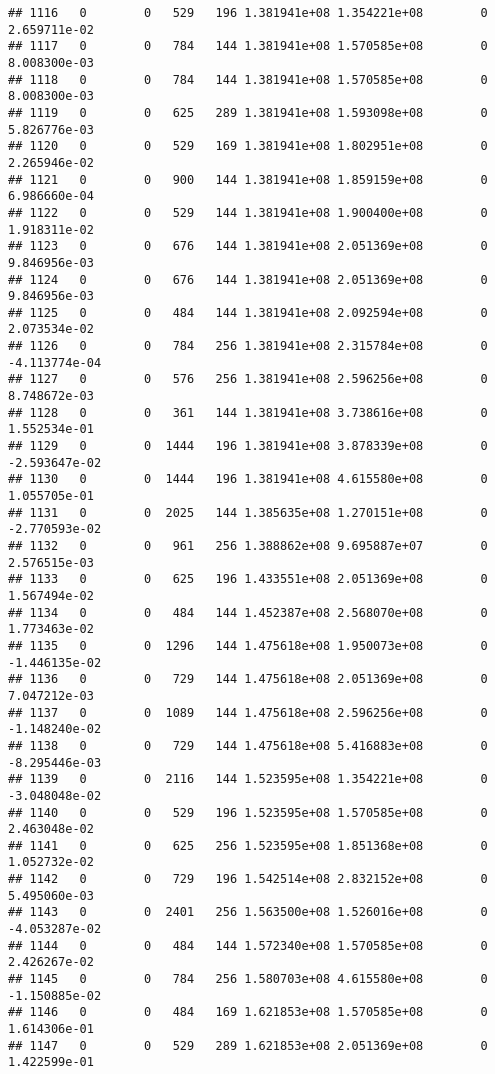 \documentclass[
]{article}
\begin{document}
\begin{enumerate}
\begin{verbatim}
## 1116   0        0   529   196 1.381941e+08 1.354221e+08        0  2.659711e-02
## 1117   0        0   784   144 1.381941e+08 1.570585e+08        0  8.008300e-03
## 1118   0        0   784   144 1.381941e+08 1.570585e+08        0  8.008300e-03
## 1119   0        0   625   289 1.381941e+08 1.593098e+08        0  5.826776e-03
## 1120   0        0   529   169 1.381941e+08 1.802951e+08        0  2.265946e-02
## 1121   0        0   900   144 1.381941e+08 1.859159e+08        0  6.986660e-04
## 1122   0        0   529   144 1.381941e+08 1.900400e+08        0  1.918311e-02
## 1123   0        0   676   144 1.381941e+08 2.051369e+08        0  9.846956e-03
## 1124   0        0   676   144 1.381941e+08 2.051369e+08        0  9.846956e-03
## 1125   0        0   484   144 1.381941e+08 2.092594e+08        0  2.073534e-02
## 1126   0        0   784   256 1.381941e+08 2.315784e+08        0 -4.113774e-04
## 1127   0        0   576   256 1.381941e+08 2.596256e+08        0  8.748672e-03
## 1128   0        0   361   144 1.381941e+08 3.738616e+08        0  1.552534e-01
## 1129   0        0  1444   196 1.381941e+08 3.878339e+08        0 -2.593647e-02
## 1130   0        0  1444   196 1.381941e+08 4.615580e+08        0  1.055705e-01
## 1131   0        0  2025   144 1.385635e+08 1.270151e+08        0 -2.770593e-02
## 1132   0        0   961   256 1.388862e+08 9.695887e+07        0  2.576515e-03
## 1133   0        0   625   196 1.433551e+08 2.051369e+08        0  1.567494e-02
## 1134   0        0   484   144 1.452387e+08 2.568070e+08        0  1.773463e-02
## 1135   0        0  1296   144 1.475618e+08 1.950073e+08        0 -1.446135e-02
## 1136   0        0   729   144 1.475618e+08 2.051369e+08        0  7.047212e-03
## 1137   0        0  1089   144 1.475618e+08 2.596256e+08        0 -1.148240e-02
## 1138   0        0   729   144 1.475618e+08 5.416883e+08        0 -8.295446e-03
## 1139   0        0  2116   144 1.523595e+08 1.354221e+08        0 -3.048048e-02
## 1140   0        0   529   196 1.523595e+08 1.570585e+08        0  2.463048e-02
## 1141   0        0   625   256 1.523595e+08 1.851368e+08        0  1.052732e-02
## 1142   0        0   729   196 1.542514e+08 2.832152e+08        0  5.495060e-03
## 1143   0        0  2401   256 1.563500e+08 1.526016e+08        0 -4.053287e-02
## 1144   0        0   484   144 1.572340e+08 1.570585e+08        0  2.426267e-02
## 1145   0        0   784   256 1.580703e+08 4.615580e+08        0 -1.150885e-02
## 1146   0        0   484   169 1.621853e+08 1.570585e+08        0  1.614306e-01
## 1147   0        0   529   289 1.621853e+08 2.051369e+08        0  1.422599e-01

\end{verbatim}
\end{enumerate}
\end{document}
